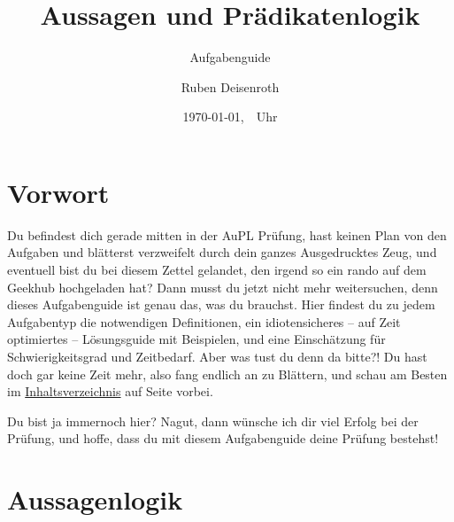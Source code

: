 \documentclass[
    ngerman,
    color=3b,
    summary,
    boxarc,
    main,
    fleqn,
    leqno,
]{rubos-tuda-template}
\title[AuPL]{Aussagen und Prädikatenlogik}
\subtitle{Aufgabenguide}
\author{Ruben Deisenroth}
\date{\today,~\currenttime~Uhr}
\newcommand*\cleartoleftpage{%
    \clearpage
    \ifodd\value{page}\hbox{}\newpage\fi
}
\begin{document}
    \label{toc}\maketitle{}
    \section{Vorwort}
    Du befindest dich gerade mitten in der AuPL Prüfung, hast keinen Plan von den Aufgaben und blätterst verzweifelt durch dein ganzes Ausgedrucktes Zeug, und eventuell bist du bei diesem Zettel gelandet, den irgend so ein rando auf dem Geekhub hochgeladen hat? Dann musst du jetzt nicht mehr weitersuchen, denn dieses Aufgabenguide ist genau das, was du brauchst. Hier findest du zu jedem Aufgabentyp die notwendigen Definitionen, ein idiotensicheres -- auf Zeit optimiertes -- Lösungsguide mit Beispielen, und eine Einschätzung für Schwierigkeitsgrad und Zeitbedarf. Aber was tust du denn da bitte?! Du hast doch gar keine Zeit mehr, also fang endlich an zu Blättern, und schau am Besten im \hyperref[toc]{Inhaltsverzeichnis} auf Seite \pageref{toc} vorbei.

    Du bist ja immernoch hier? Nagut, dann wünsche ich dir viel Erfolg bei der Prüfung, und hoffe, dass du mit diesem Aufgabenguide deine Prüfung bestehst!
    \tableofcontents %



    \vspace{\fill}
    \mbox{}
    \cleartoleftpage{}
    \section{Aussagenlogik}
\end{document}
